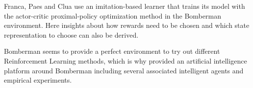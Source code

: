 Franca, Paes and Clua \cite{Franca2019} use an imitation-based learner that trains its model with the actor-critic proximal-policy optimization method in the Bomberman environment. Here insights about how rewards need to be chosen and which state representation to choose can also be derived. 

Bomberman seems to provide a perfect environment to try out different Reinforcement Learning methods, which is why \cite{daCruzLopes2016} provided an artificial intelligence platform around Bomberman including several associated intelligent agents and empirical experiments.

\newpage
